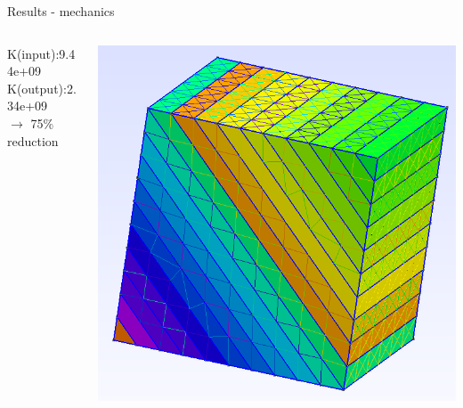 \begin{frame}[fragile]{Results - mechanics}
\begin{columns}[T] %
\begin{column}{.48\textwidth}
K(input):9.44e+09\\
K(output):2.34e+09\\
$\rightarrow$ 75\% reduction
\end{column}
\begin{column}{.48\textwidth}
\includegraphics[width=\textwidth]{png/poromec-fracture-full.png}
\end{column}
\end{columns}
\end{frame}


